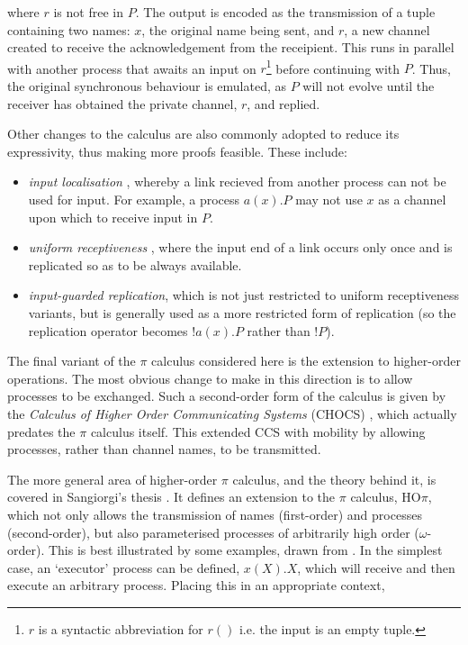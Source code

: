 \noindent where $r$ is not free in $P$.  The output is encoded as the
transmission of a tuple containing two names: $x$, the original name
being sent, and $r$, a new channel created to receive the
acknowledgement from the receipient.  This runs in parallel with
another process that awaits an input on $r$\footnote{$r$ is a
  syntactic abbreviation for $r()$ i.e. the input is an empty tuple.}
before continuing with $P$.  Thus, the original synchronous behaviour
is emulated, as $P$ will not evolve until the receiver has obtained
the private channel, $r$, and replied.

Other changes to the calculus are also commonly adopted to reduce its
expressivity, thus making more proofs feasible.  These include:

\begin{itemize}
\item \emph{input localisation} \cite{merro:locality}, whereby a link
  recieved from another process can not be used for input.  For
  example, a process $a(x).P$ may not use $x$ as a channel upon which
  to receive input in $P$.
\item \emph{uniform receptiveness}
  \cite{sangiorgi:uniformreceptiveness}, where the input end of a link
  occurs only once and is replicated so as to be always available.
\item \emph{input-guarded replication}, which is not just restricted
  to uniform receptiveness variants, but is generally used as a more
  restricted form of replication (so the replication operator becomes
  $!a(x).P$ rather than $!P$).
\end{itemize}

The final variant of the $\pi$ calculus considered here is the
extension to higher-order operations.  The most obvious change to make
in this direction is to allow processes to be exchanged.  Such a
second-order form of the calculus is given by the \emph{Calculus of
  Higher Order Communicating Systems} (CHOCS) \cite{thomsen:chocs},
which actually predates the $\pi$ calculus itself.  This extended CCS
with mobility by allowing processes, rather than channel names, to be
transmitted.

The more general area of higher-order $\pi$ calculus, and the theory
behind it, is covered in Sangiorgi's thesis \cite{sangiorgi:phd}.  It
defines an extension to the $\pi$ calculus, HO$\pi$, which not only
allows the transmission of names (first-order) and processes
(second-order), but also parameterised processes of arbitrarily high
order ($\omega$-order).  This is best illustrated by some examples,
drawn from \cite{sangiorgi:phd}.  In the simplest case, an `executor'
process can be defined, $x(X).X$, which will receive and then execute an
arbitrary process.  Placing this in an appropriate context,

